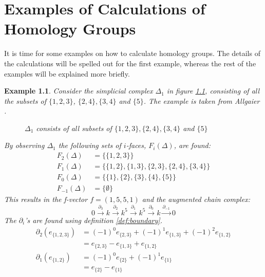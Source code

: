 \documentclass[11pt,a4paper,twoside]{report}
\newtheorem{myex}[mythm]{Example}
\begin{document}
\chapter{Examples of Calculations of Homology Groups}
It is time for some examples on how to calculate homology groups. The details of the calculations will be spelled out for the first example, whereas the rest of the examples will be explained more briefly.
\begin{myex}
Consider the simplicial complex $\Delta_1$ in figure \ref{fig:ex1}, consisting of all the subsets of $\{1,2,3\}$, $\{2,4\},\{3,4\}$ and $\{5\}$. The example is taken from Allgaier \cite[p.2]{Allgaier}.
\begin{figure}[H]
\center
{}
\caption{$\Delta_1$ consists of all subsets of $\{1,2,3\},\{2,4\},\{3,4\}$ and $\{5\}$}
\label{fig:ex1}
\end{figure}
By observing $\Delta_1$ the following sets of $i$-faces, $F_i(\Delta)$, are found:
\begin{align*}
F_2(\Delta) &= \{\{1,2,3\}\}\\
F_1(\Delta) &= \{\{1,2\},\{1,3\},\{2,3\},\{2,4\},\{3,4\}\}\\
F_0(\Delta) &= \{\{1\},\{2\},\{3\},\{4\},\{5\}\}\\
F_{-1}(\Delta) &= \{\emptyset\}
\end{align*}
This results in the f-vector $f=(1,5,5,1)$ and the augmented chain complex:
\begin{equation*}
0\overset{\partial_3}{\longrightarrow} k\overset{\partial_2}{\longrightarrow} k^5\overset{\partial_1}{\longrightarrow} k^5\overset{\partial_0}{\longrightarrow} k \overset{\partial_{-1}}{\to} 0
\end{equation*}
The $\partial_i$'s are found using definition \ref{def:boundary}. 
\begin{align*}
\partial_2(e_{\{1,2,3\}})&=(-1)^0e_{\{2,3\}}+(-1)^1e_{\{1,3\}}+(-1)^2e_{\{1,2\}}\\
&=e_{\{2,3\}}-e_{\{1,3\}}+e_{\{1,2\}}\\
\partial_1(e_{\{1,2\}})&=(-1)^0e_{\{2\}}+(-1)^1e_{\{1\}}\\
&=e_{\{2\}}-e_{\{1\}}\\

\end{align*}
\end{myex}
\end{document}

